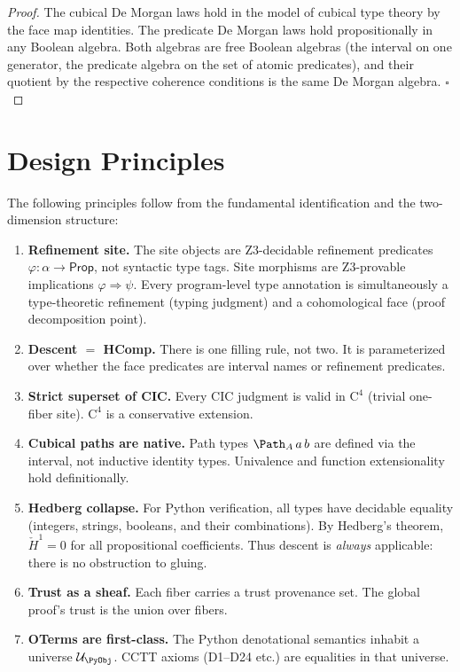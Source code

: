 \begin{proof}
The cubical De Morgan laws hold in the model of cubical type theory
by the face map identities.  The predicate De Morgan laws hold
propositionally in any Boolean algebra.  Both algebras are free
Boolean algebras (the interval on one generator, the predicate algebra
on the set of atomic predicates), and their quotient by the respective
coherence conditions is the same De Morgan algebra.
\hfill\(\square\)
\end{proof}


\section{Design Principles}
\label{sec:design-principles}

The following principles follow from the fundamental identification
and the two-dimension structure:

\begin{enumerate}
\item \textbf{Refinement site.}  The site objects are
  Z3-decidable refinement predicates \(\varphi : \alpha \to \mathsf{Prop}\),
  not syntactic type tags.  Site morphisms are Z3-provable implications
  \(\varphi \Rightarrow \psi\).  Every program-level type annotation
  is simultaneously a type-theoretic refinement (typing judgment)
  and a cohomological face (proof decomposition point).

\item \textbf{Descent \(=\) HComp.}
  There is one filling rule, not two.  It is parameterized over
  whether the face predicates are interval names or refinement
  predicates.

\item \textbf{Strict superset of CIC.}  Every CIC judgment is valid
  in \(\mathrm{C}^4\) (trivial one-fiber site).  \(\mathrm{C}^4\) is a
  conservative extension.

\item \textbf{Cubical paths are native.}  Path types \(\Path_A\, a\, b\)
  are defined via the interval, not inductive identity types.
  Univalence and function extensionality hold definitionally.

\item \textbf{Hedberg collapse.}  For Python verification, all types
  have decidable equality (integers, strings, booleans, and their
  combinations).  By Hedberg's theorem, \(\check{H}^1 = 0\) for all
  propositional coefficients.  Thus descent is \emph{always} applicable:
  there is no obstruction to gluing.

\item \textbf{Trust as a sheaf.}  Each fiber carries a trust provenance
  set.  The global proof's trust is the union over fibers.

\item \textbf{OTerms are first-class.}  The Python denotational
  semantics inhabit a universe \(\mathcal{U}_\PyObj\).
  CCTT axioms (D1--D24 etc.) are equalities in that universe.
\end{enumerate}


